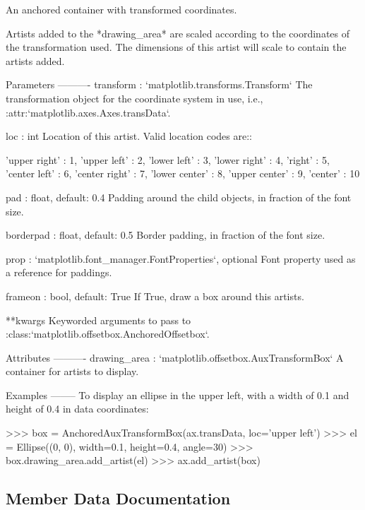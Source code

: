 \begin{DoxyVerb}An anchored container with transformed coordinates.

Artists added to the *drawing_area* are scaled according to the
coordinates of the transformation used. The dimensions of this artist
will scale to contain the artists added.

Parameters
----------
transform : `matplotlib.transforms.Transform`
    The transformation object for the coordinate system in use, i.e.,
    :attr:`matplotlib.axes.Axes.transData`.

loc : int
    Location of this artist. Valid location codes are::

'upper right'  : 1,
'upper left'   : 2,
'lower left'   : 3,
'lower right'  : 4,
'right'        : 5,
'center left'  : 6,
'center right' : 7,
'lower center' : 8,
'upper center' : 9,
'center'       : 10

pad : float, default: 0.4
    Padding around the child objects, in fraction of the font size.

borderpad : float, default: 0.5
    Border padding, in fraction of the font size.

prop : `matplotlib.font_manager.FontProperties`, optional
    Font property used as a reference for paddings.

frameon : bool, default: True
    If True, draw a box around this artists.

**kwargs
    Keyworded arguments to pass to
    :class:`matplotlib.offsetbox.AnchoredOffsetbox`.

Attributes
----------
drawing_area : `matplotlib.offsetbox.AuxTransformBox`
    A container for artists to display.

Examples
--------
To display an ellipse in the upper left, with a width of 0.1 and
height of 0.4 in data coordinates:

>>> box = AnchoredAuxTransformBox(ax.transData, loc='upper left')
>>> el = Ellipse((0, 0), width=0.1, height=0.4, angle=30)
>>> box.drawing_area.add_artist(el)
>>> ax.add_artist(box)
\end{DoxyVerb}
 

\subsection{Member Data Documentation}
\mbox{\label{classaxes__grid1_1_1anchored__artists_1_1AnchoredAuxTransformBox_adb2f663ce6e8605acb3ebb045e6799e1}} 
